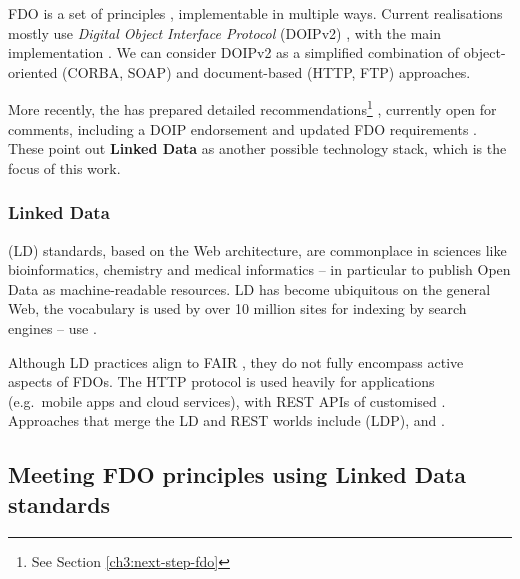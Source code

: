 FDO is a set of principles \cite{Bonino 2019}, implementable in multiple ways. Current realisations mostly
use \emph{Digital Object Interface Protocol} (DOIPv2)
\cite{DONA 2018}, with the
main implementation
. We
can consider DOIPv2 as a simplified combination of object-oriented
(CORBA, SOAP) and document-based (HTTP, FTP) approaches.

More recently, the  has prepared 
detailed recommendations\footnote{See Section \vref{ch3:next-step-fdo}} \cite{FDO Specs},
currently open for comments, including a
DOIP endorsement \cite{Schwardmann 2022a} and updated
FDO requirements \cite{Anders 2023}. These point out \textbf{Linked Data} as another possible
technology stack, which is the focus of this work.

\subsubsection{Linked Data}
\label{ch2:linked-data}

 (LD) standards, based on the Web architecture, are commonplace in
sciences like bioinformatics, chemistry and medical informatics -- in
particular to publish Open Data as machine-readable resources. LD has
become ubiquitous on the general Web, the
 vocabulary is used by over 10
million sites for indexing by search engines --
 use .

Although \acrshort{LD} practices align to \acrshort{FAIR} \cite{Hasnain 2018},
they do not fully encompass active aspects of FDOs. The HTTP protocol is
used heavily for applications (e.g.~mobile apps and cloud services),
with \acrshort{REST} \acrshort{API}s of customised . Approaches that merge the LD and REST worlds include
 (LDP),
 and
.


\subsection{Meeting FDO principles using Linked Data
standards}\label{ch2:meeting-fdo-principles-using-linked-data-standards}

